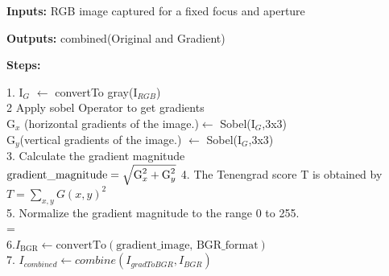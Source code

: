 \documentclass[sn-mathphys]{sn-jnl}%
\theoremstyle{thmstyleone}%
\theoremstyle{thmstyletwo}%
\theoremstyle{thmstylethree}%
\begin{document}
\begin{algorithm}
\caption{Compute\textunderscore Tenengrad\textunderscore Score.}
\label{alg:Alg1}
\textbf{Inputs:} RGB image captured for a fixed focus and aperture

\textbf{Outputs:} combined(Original and Gradient)

\textbf{Steps:}

1.  I$_{G}$ $\leftarrow$ convert\textunderscore To \textunderscore  gray(I$_{RGB}$)\\
2   Apply sobel Operator to get gradients\\
    \hspace{2cm}G$_{x}$ (horizontal gradients of the image.)$\leftarrow$ Sobel(I$_{G}$,3x3)\\
    \hspace{2cm}G$_{y}$(vertical gradients of the image.) $\leftarrow$ Sobel(I$_{G}$,3x3)\\
3. Calculate the gradient magnitude\\
 $\text{gradient\_magnitude} = \sqrt{\text{G}_x^2 + \text{G}_y^2}\\$
 4. The Tenengrad score T is obtained by 
$T=\sum_{x, y} G(x, y)^2$ \\
5. Normalize the gradient magnitude to the range 0 to 255.\\
    \hspace{2cm}= \\
6.$ I_{\text{BGR}} \leftarrow \text{convertTo}(\text{gradient\_image, BGR\_format})$
\\
7. $I_{combined} \leftarrow combine(I_{gradToBGR}, I_{BGR})$

\end{algorithm}



 
\sloppy
\end{document}
